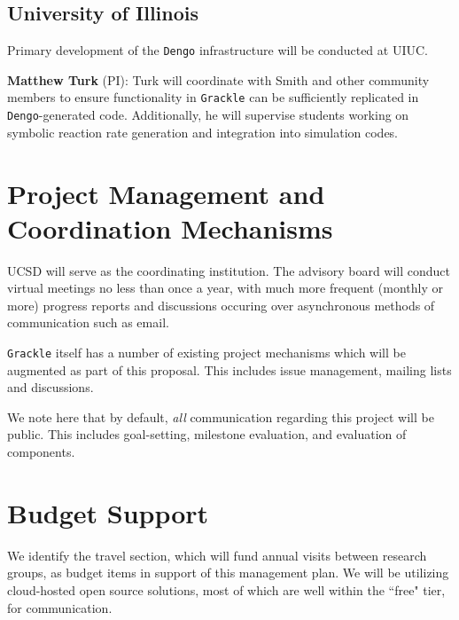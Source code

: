 \documentclass[11pt]{article}
\newcommand{\grackle}{\texttt{Grackle}}
\newcommand{\dengo}{\texttt{Dengo}}
\begin{document}
\subsection{University of Illinois}

Primary development of the \dengo{} infrastructure will be conducted at UIUC.

\noindent \textbf{Matthew Turk} (PI):  Turk will coordinate with Smith and
other community members to ensure functionality in \grackle{} can be
sufficiently replicated in \dengo{}-generated code.  Additionally, he will
supervise students working on symbolic reaction rate generation and integration
into simulation codes.

\section{Project Management and Coordination Mechanisms}

UCSD will serve as the coordinating institution.
The advisory board will conduct
virtual meetings no less than once a year, with much more frequent (monthly or
more) progress reports and discussions occuring over asynchronous methods of
communication such as email.

\grackle{} itself has a number of existing project mechanisms which will
be augmented as part of this proposal.  This includes issue management, mailing
lists and discussions.

We note here that by default, \textit{all} communication regarding this project
will be public.  This includes goal-setting, milestone evaluation, and
evaluation of components.

\section{Budget Support}

We identify the travel section, which will fund annual visits between research
groups, as budget items in support of this management plan.  We will be
utilizing cloud-hosted open source solutions, most of which are well within the
``free" tier, for communication.
\end{document}
